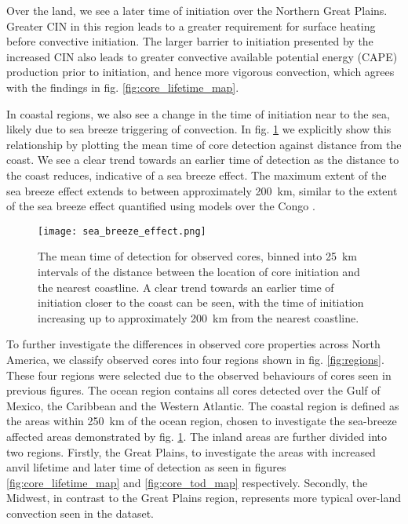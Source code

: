 Over the land, we see a later time of initiation over the Northern Great Plains.
Greater CIN in this region leads to a greater requirement for surface heating before convective initiation.
The larger barrier to initiation presented by the increased CIN also leads to greater convective available potential energy (CAPE) production prior to initiation, and hence more vigorous convection, which agrees with the findings in fig. \ref{fig:core_lifetime_map}.

In coastal regions, we also see a change in the time of initiation near to the sea, likely due to sea breeze triggering of convection.
In fig. \ref{fig:sea_breeze_effect} we explicitly show this relationship by plotting the mean time of core detection against distance from the coast.
We see a clear trend towards an earlier time of detection as the distance to the coast reduces, indicative of a sea breeze effect.
The maximum extent of the sea breeze effect extends to between approximately 200~\unit{km}, similar to the extent of the sea breeze effect quantified using models over the Congo \citep{park_environmental_2020}.

\begin{figure}[t]
    \centering
    \texttt{[image: sea\_breeze\_effect.png]}
    \caption{The mean time of detection for observed cores, binned into 25~km intervals of the distance between the location of core initiation and the nearest coastline. A clear trend towards an earlier time of initiation closer to the coast can be seen, with the time of initiation increasing up to approximately 200~km from the nearest coastline.}
    \label{fig:sea_breeze_effect}
\end{figure}

To further investigate the differences in observed core properties across North America, we classify observed cores into four regions shown in fig. \ref{fig:regions}.
These four regions were selected due to the observed behaviours of cores seen in previous figures.
The ocean region contains all cores detected over the Gulf of Mexico, the Caribbean and the Western Atlantic.
The coastal region is defined as the areas within 250~km of the ocean region, chosen to investigate the sea-breeze affected areas demonstrated by fig. \ref{fig:sea_breeze_effect}.
The inland areas are further divided into two regions.
Firstly, the Great Plains, to investigate the areas with increased anvil lifetime and later time of detection as seen in figures \ref{fig:core_lifetime_map} and \ref{fig:core_tod_map} respectively.
Secondly, the Midwest, in contrast to the Great Plains region, represents more typical over-land convection seen in the dataset.


